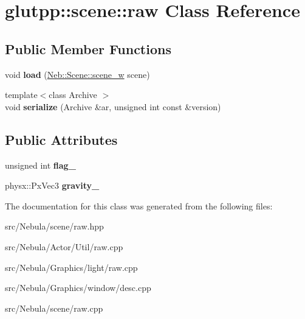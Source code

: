 \hypertarget{classglutpp_1_1scene_1_1raw}{\section{glutpp\-:\-:scene\-:\-:raw \-Class \-Reference}
\label{classglutpp_1_1scene_1_1raw}
}
\subsection*{\-Public \-Member \-Functions}
\begin{DoxyCompactItemize}
\item 
\hypertarget{classglutpp_1_1scene_1_1raw_a596009c3120c66eedb6ebdbb79a6ab8d}{void {\bfseries load} (\hyperlink{classNeb_1_1weak__ptr}{\-Neb\-::\-Scene\-::scene\-\_\-w} scene)}\label{classglutpp_1_1scene_1_1raw_a596009c3120c66eedb6ebdbb79a6ab8d}

\item 
\hypertarget{classglutpp_1_1scene_1_1raw_ae3066d954cd99a2551da179be7612af0}{{\footnotesize template$<$class Archive $>$ }\\void {\bfseries serialize} (\-Archive \&ar, unsigned int const \&version)}\label{classglutpp_1_1scene_1_1raw_ae3066d954cd99a2551da179be7612af0}

\end{DoxyCompactItemize}
\subsection*{\-Public \-Attributes}
\begin{DoxyCompactItemize}
\item 
\hypertarget{classglutpp_1_1scene_1_1raw_a7ea24c9872420ab621799bbb2d47c73d}{unsigned int {\bfseries flag\-\_\-}}\label{classglutpp_1_1scene_1_1raw_a7ea24c9872420ab621799bbb2d47c73d}

\item 
\hypertarget{classglutpp_1_1scene_1_1raw_a86841c5a5a09e63e0c3f6cff374db7de}{physx\-::\-Px\-Vec3 {\bfseries gravity\-\_\-}}\label{classglutpp_1_1scene_1_1raw_a86841c5a5a09e63e0c3f6cff374db7de}

\end{DoxyCompactItemize}


\-The documentation for this class was generated from the following files\-:\begin{DoxyCompactItemize}
\item 
src/\-Nebula/scene/raw.\-hpp\item 
src/\-Nebula/\-Actor/\-Util/raw.\-cpp\item 
src/\-Nebula/\-Graphics/light/raw.\-cpp\item 
src/\-Nebula/\-Graphics/window/desc.\-cpp\item 
src/\-Nebula/scene/raw.\-cpp\end{DoxyCompactItemize}
